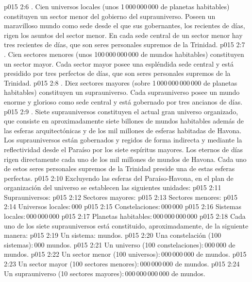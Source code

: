 \vs p015 2:6 . Cien universos locales (unos 1\,000\,000\,000 de planetas habitables) constituyen un sector menor del gobierno del suprauniverso. Poseen un maravilloso mundo como sede desde el que sus gobernantes, los recientes de días, rigen los asuntos del sector menor. En cada sede central de un sector menor hay tres recientes de días, que son seres personales supremos de la Trinidad.
\vs p015 2:7 . Cien sectores menores (unos 100\,000\,000\,000 de mundos habitables) constituyen un sector mayor. Cada sector mayor posee una espléndida sede central y está presidido por tres perfectos de días, que son seres personales supremos de la Trinidad.
\vs p015 2:8 . Diez sectores mayores (sobre 1\,000\,000\,000\,000 de planetas habitables) constituyen un suprauniverso. Cada suprauniverso posee un mundo enorme y glorioso como sede central y está gobernado por tres ancianos de días.
\vs p015 2:9 . Siete suprauniversos constituyen el actual gran universo organizado, que consiste en aproximadamente siete billones de mundos habitables además de las esferas arquitectónicas y de los mil millones de esferas habitadas de Havona. Los suprauniversos están gobernados y regidos de forma indirecta y mediante la reflectividad desde el Paraíso por los siete espíritus mayores. Los eternos de días rigen directamente cada uno de los mil millones de mundos de Havona. Cada uno de estos seres personales supremos de la Trinidad preside una de estas esferas perfectas.
\vs p015 2:10 \pc Excluyendo las esferas del Paraíso\hyp{}Havona, en el plan de organización del universo se establecen las siguientes unidades:
\vs p015 2:11 Suprauniversos:
\vs p015 2:12 Sectores mayores:
\vs p015 2:13 Sectores menores:
\vs p015 2:14 Universos locales:\,000
\vs p015 2:15 Constelaciones:\,000\,000
\vs p015 2:16 Sistemas locales:\,000\,000\,000
\vs p015 2:17 \pc Planetas habitables:\,000\,000\,000\,000
\vs p015 2:18 Cada uno de los siete suprauniversos está constituido, aproximadamente, de la siguiente manera:
\vs p015 2:19 Un sistema: mundos.
\vs p015 2:20 Una constelación (100 sistemas):\,000 mundos.
\vs p015 2:21 Un universo (100 constelaciones):\,000\,000 de mundos.
\vs p015 2:22 Un sector menor (100 universos):\,000\,000\,000 de mundos.
\vs p015 2:23 Un sector mayor (100 sectores menores):\,000\,000\,000 de mundos.
\vs p015 2:24 Un suprauniverso (10 sectores mayores):\,000\,000\,000\,000 de mundos.
